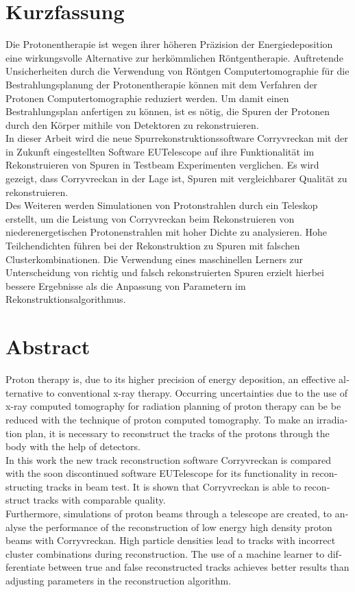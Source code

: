 \thispagestyle{plain}

\section*{Kurzfassung}
Die Protonentherapie ist wegen ihrer höheren Präzision der Energiedeposition eine wirkungsvolle Alternative zur herkömmlichen Röntgentherapie.
Auftretende Unsicherheiten durch die Verwendung von Röntgen Computertomographie für die Bestrahlungsplanung der Protonentherapie können mit dem Verfahren der Protonen Computertomographie reduziert werden.
Um damit einen Bestrahlungsplan anfertigen zu können, ist es nötig, die Spuren der Protonen durch den Körper mithile von Detektoren zu rekonstruieren. \\
In dieser Arbeit wird die neue Spurrekonstruktionssoftware Corryvreckan mit der in Zukunft eingestellten Software EUTelescope auf ihre Funktionalität im
Rekonstruieren von Spuren in Testbeam Experimenten verglichen. Es wird gezeigt, dass Corryvreckan in der Lage ist, Spuren mit vergleichbarer Qualität zu rekonstruieren.\\
Des Weiteren werden Simulationen von Protonstrahlen durch ein Teleskop erstellt, um die Leistung von Corryvreckan beim Rekonstruieren von niederenergetischen
Protonenstrahlen mit hoher Dichte zu analysieren. Hohe Teilchendichten führen bei der Rekonstruktion zu Spuren mit falschen Clusterkombinationen.
Die Verwendung eines maschinellen Lerners zur Unterscheidung von richtig und falsch rekonstruierten Spuren
erzielt hierbei bessere Ergebnisse als die Anpassung von Parametern im Rekonstruktionsalgorithmus.

\section*{Abstract}
\begin{english}
Proton therapy is, due to its higher precision of energy deposition,
an effective alternative to conventional x-ray therapy. Occurring
uncertainties due to the use of x-ray computed tomography for radiation planning of proton therapy can be
be reduced with the technique of proton computed tomography. To
make an irradiation plan, it is necessary to reconstruct the tracks of the protons
through the body with the help of detectors. \\
In this work the new track reconstruction software Corryvreckan is compared with the soon discontinued
software EUTelescope for its functionality in reconstructing tracks in beam test.
It is shown that
Corryvreckan is able to reconstruct tracks with comparable quality. \\
Furthermore, simulations of proton beams through a telescope are created,
to analyse the performance of the reconstruction of low energy high density proton beams with Corryvreckan.
High particle densities lead to tracks with incorrect cluster combinations during reconstruction.
The use of a machine learner
to differentiate between true and false reconstructed tracks achieves better results than adjusting parameters in the reconstruction algorithm.


\end{english}
